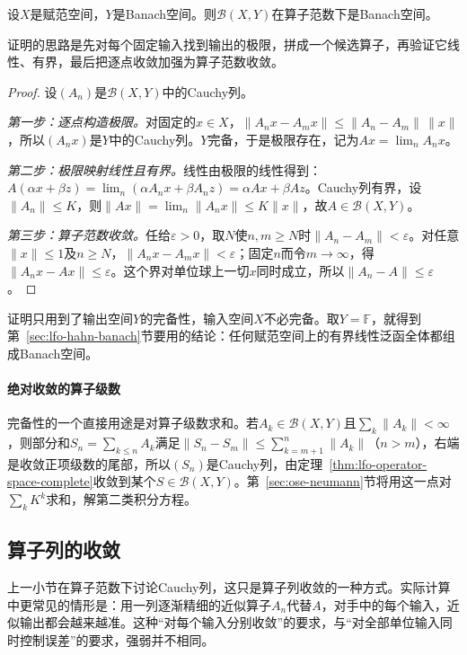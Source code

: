 \begin{theorem}[算子空间的完备性]
\label{thm:lfo-operator-space-complete}
设$X$是赋范空间，$Y$是Banach空间。则$\mathcal B(X,Y)$在算子范数下是Banach空间。
\end{theorem}

证明的思路是先对每个固定输入找到输出的极限，拼成一个候选算子，再验证它线性、有界，最后把逐点收敛加强为算子范数收敛。

\begin{proof}
设$(A_n)$是$\mathcal B(X,Y)$中的Cauchy列。

\emph{第一步：逐点构造极限。}对固定的$x\in X$，$\|A_nx-A_mx\|\leq\|A_n-A_m\|\,\|x\|$，所以$(A_nx)$是$Y$中的Cauchy列。$Y$完备，于是极限存在，记为$Ax=\lim_nA_nx$。

\emph{第二步：极限映射线性且有界。}线性由极限的线性得到：$A(\alpha x+\beta z)=\lim_n(\alpha A_nx+\beta A_nz)=\alpha Ax+\beta Az$。Cauchy列有界，设$\|A_n\|\leq K$，则$\|Ax\|=\lim_n\|A_nx\|\leq K\|x\|$，故$A\in\mathcal B(X,Y)$。

\emph{第三步：算子范数收敛。}任给$\varepsilon>0$，取$N$使$n,m\geq N$时$\|A_n-A_m\|<\varepsilon$。对任意$\|x\|\leq1$及$n\geq N$，$\|A_nx-A_mx\|<\varepsilon$；固定$n$而令$m\to\infty$，得$\|A_nx-Ax\|\leq\varepsilon$。这个界对单位球上一切$x$同时成立，所以$\|A_n-A\|\leq\varepsilon$。
\end{proof}

证明只用到了输出空间$Y$的完备性，输入空间$X$不必完备。取$Y=\mathbb F$，就得到第~\ref{sec:lfo-hahn-banach}节要用的结论：任何赋范空间上的有界线性泛函全体都组成Banach空间。

\paragraph{绝对收敛的算子级数}
完备性的一个直接用途是对算子级数求和。若$A_k\in\mathcal B(X,Y)$且$\sum_k\|A_k\|<\infty$，则部分和$S_n=\sum_{k\leq n}A_k$满足$\|S_n-S_m\|\leq\sum_{k=m+1}^n\|A_k\|$（$n>m$），右端是收敛正项级数的尾部，所以$(S_n)$是Cauchy列，由定理~\ref{thm:lfo-operator-space-complete}收敛到某个$S\in\mathcal B(X,Y)$。第~\ref{sec:ose-neumann}节将用这一点对$\sum_kK^k$求和，解第二类积分方程。

\subsection{算子列的收敛}
\label{sec:lfo-operator-convergence}

上一小节在算子范数下讨论Cauchy列，这只是算子列收敛的一种方式。实际计算中更常见的情形是：用一列逐渐精细的近似算子$A_n$代替$A$，对手中的每个输入，近似输出都会越来越准。这种“对每个输入分别收敛”的要求，与“对全部单位输入同时控制误差”的要求，强弱并不相同。

